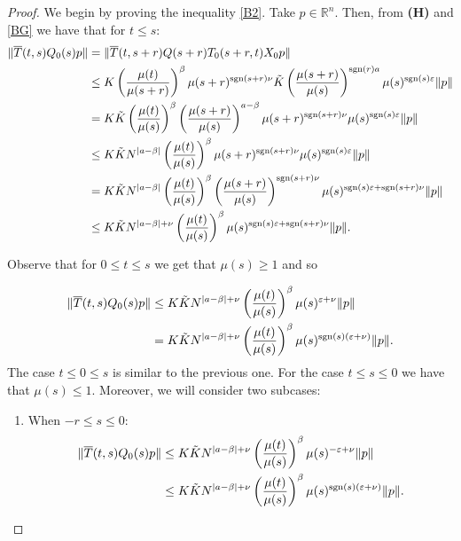\documentclass[9pt]{amsart}
\numberwithin{equation}{section}
\numberwithin{lemma}{section}
\begin{document}
\begin{proof}
We begin by proving the inequality \eqref{B2}.
    Take $p\in\mathbb{R}^n$. Then, from \textbf{(H)} and \eqref{BG}  we have that for $t\leq s$: 
    \begin{align*}
       \|\overline{T}(t,s)Q_0(s)p\| &= \|\overline{T}(t,s+r)Q(s+r)T_0(s+r,t)X_0 p\|\\
       &\leq K\left(\frac{\mu(t)}{\mu(s+r)}\right)^{\beta}\mu(s+r)^{\textnormal{sgn}(s+r)\nu}\tilde{K}\left(\frac{\mu(s+r)}{\mu(s)}\right)^{\textnormal{sgn}(r)a}\mu(s)^{\textnormal{sgn}(s)\varepsilon}\|p\|\\
       &= K\tilde{K}\left(\frac{\mu(t)}{\mu(s)}\right)^{\beta}\left(\frac{\mu(s+r)}{\mu(s)}\right)^{a-\beta}\mu(s+r)^{\textnormal{sgn}(s+r)\nu}\mu(s)^{\textnormal{sgn}(s)\varepsilon}\|p\|\\
       &\leq K\tilde{K}N^{|a-\beta|}\left(\frac{\mu(t)}{\mu(s)}\right)^{\beta}\mu(s+r)^{\textnormal{sgn}(s+r)\nu}\mu(s)^{\textnormal{sgn}(s)\varepsilon}\|p\|\\
       &=  K\tilde{K}N^{|a-\beta|}\left(\frac{\mu(t)}{\mu(s)}\right)^{\beta}\left(\frac{\mu(s+r)}{\mu(s)}\right)^{\textnormal{sgn}(s+r)\nu}\mu(s)^{\textnormal{sgn}(s)\varepsilon+\textnormal{sgn}(s+r)\nu}\|p\|\\
       &\leq K\tilde{K}N^{|a-\beta|+\nu}\left(\frac{\mu(t)}{\mu(s)}\right)^{\beta}\mu(s)^{\textnormal{sgn}(s)\varepsilon+\textnormal{sgn}(s+r)\nu}\|p\|.
    \end{align*}

    Observe that for $0\leq t\leq s$ we get that $\mu(s)\geq 1$ and so

    \begin{align*}
         \|\overline{T}(t,s)Q_0(s)p\| &\leq K\tilde{K}N^{|a-\beta|+\nu}\left(\frac{\mu(t)}{\mu(s)}\right)^{\beta}\mu(s)^{\varepsilon+\nu}\|p\|\\
         &=  K\tilde{K}N^{|a-\beta|+\nu}\left(\frac{\mu(t)}{\mu(s)}\right)^{\beta}\mu(s)^{\textnormal{sgn}(s)(\varepsilon+\nu)}\|p\|.
    \end{align*}
    The case $t\leq 0\leq s$ is similar to the previous one. For the case $t\leq s\leq 0$ we have that $\mu(s)\leq1$. Moreover,  we will consider two subcases: 
    \begin{enumerate}
        \item[(i)] When $-r\leq s\leq 0$: 
        \begin{align*}
            \|\overline{T}(t,s)Q_0(s)p\| &\leq K\tilde{K}N^{|a-\beta|+\nu}\left(\frac{\mu(t)}{\mu(s)}\right)^{\beta}\mu(s)^{-\varepsilon+\nu}\|p\|\\
            &\leq K\tilde{K}N^{|a-\beta|+\nu}\left(\frac{\mu(t)}{\mu(s)}\right)^{\beta}\mu(s)^{\textnormal{sgn}(s)(\varepsilon+\nu)}\|p\|.
        \end{align*}


\end{enumerate}
\end{proof}
\end{document}
